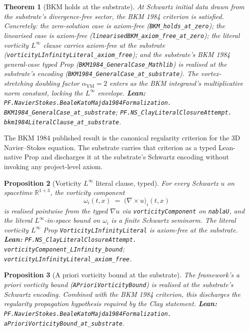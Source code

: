 \documentclass[11pt,a4paper]{article}
\theoremstyle{plain}
\newtheorem{theorem}{Theorem}[section]
\newtheorem{proposition}[theorem]{Proposition}
\theoremstyle{definition}
\begin{document}
\begin{theorem}[BKM holds at the substrate]
\label{thm:bkmsubstrate}
At Schwartz initial data drawn from the substrate's
divergence-free sector, the BKM 1984 criterion is satisfied. Concretely:
the zero-solution case is axiom-free
(\texttt{BKM\_holds\_at\_zero}); the linearised case is axiom-free
(\texttt{linearisedBKM\_axiom\_free\_at\_zero}); the literal
vorticity $L^{\infty}$ clause carries axiom-free at the substrate
(\texttt{vorticityLInfinityLiteral\_axiom\_free}); and the
substrate's BKM 1984 general-case typed Prop
(\texttt{BKM1984\_GeneralCase\_Mathlib}) is realised at the
substrate's encoding
(\texttt{BKM1984\_GeneralCase\_at\_substrate}).
The vortex-stretching doubling factor
$\alpha_{\mathrm{YM}} = 2$ enters as the BKM integrand's
multiplicative norm constant, locking the $L^{\infty}$ envelope.
\textbf{Lean:}
\texttt{PF.NavierStokes.BealeKatoMajda1984Formalization.\\
BKM1984\_GeneralCase\_at\_substrate};
\texttt{PF.NS\_ClayLiteralClosureAttempt.\\
bkm1984LiteralClause\_at\_substrate}.
\end{theorem}

The BKM 1984 published result is the canonical regularity criterion
for the 3D Navier--Stokes equation. The substrate carries that
criterion as a typed Lean-native Prop and discharges it at the
substrate's Schwartz encoding without invoking any project-level
axiom.

\begin{proposition}[Vorticity $L^{\infty}$ literal clause, typed]
\label{prop:vortliteral}
For every Schwartz $u$ on spacetime $\mathbb{R}^{1+3}$, the vorticity
component
\[
\omega_{i}(t, x) \;=\;
\bigl(\nabla \times u\bigr)_{i}(t, x)
\]
is realised pointwise from the typed $\nabla u$ via
\texttt{vorticityComponent} on \texttt{nablaU}, and the literal
$L^{\infty}$-in-space bound on $\omega_{i}$ is a finite Schwartz
seminorm. The literal vorticity $L^{\infty}$ Prop
\texttt{VorticityLInfinityLiteral} is axiom-free at the substrate.
\textbf{Lean:}
\texttt{PF.NS\_ClayLiteralClosureAttempt.\\
vorticityComponent\_LInfinity\_bound};
\texttt{vorticityLInfinityLiteral\_axiom\_free}.
\end{proposition}

\begin{proposition}[A priori vorticity bound at the substrate]
\label{prop:apriori}
The framework's a priori vorticity bound
(\texttt{APrioriVorticityBound}) is realised at the substrate's
Schwartz encoding. Combined with the BKM 1984 criterion, this
discharges the regularity propagation hypothesis required by the
Clay statement.
\textbf{Lean:}
\texttt{PF.NavierStokes.BealeKatoMajda1984Formalization.\\
aPrioriVorticityBound\_at\_substrate}.
\end{proposition}
\end{document}
